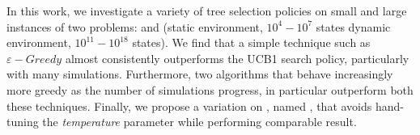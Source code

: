 In this work, we investigate a variety of tree selection policies on small and large instances of two problems: \rock and \poc (static environment, $10^4 - 10^7$ states \vs dynamic environment, $10^{11} - 10^{18}$ states). We find that a simple technique such as $\varepsilon-Greedy$ almost consistently outperforms the UCB1 search policy, particularly with many simulations. Furthermore, two algorithms that behave increasingly more greedy as the number of simulations progress, in particular \soft outperform both these techniques. Finally, we propose a variation on \soft, named \rsoft, that avoids hand-tuning the \emph{temperature} parameter while performing comparable result.